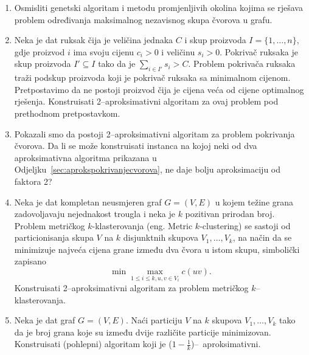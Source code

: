 \documentclass[a4paper, utf8, 11pt, colorlinks]{book}
\theoremstyle{definition}
\begin{document}
\begin{enumerate}
		\item Osmisliti genetski algoritam i metodu promjenljivih okolina kojima se rješava problem određivanja maksimalnog nezavisnog skupa čvorova u grafu.
		\item %
		   Neka je dat ruksak čija je veličina jednaka $C$ i skup proizvoda $I = \{1,\ldots, n\}$, gdje proizvod $i$ ima svoju cijenu $c_i>0$ i veličinu $s_i>0$. Pokrivač ruksaka je skup proizvoda $I' \subseteq I$ tako da je $\sum_{i \in I'} s_i > C$.  Problem pokrivača ruksaka traži podskup proizvoda koji je pokrivač ruksaka sa minimalnom    cijenom.   Pretpostavimo da ne postoji proizvod čija je cijena veća od    cijene optimalnog rješenja. Konstruisati 2--aproksimativni algoritam za ovaj problem pod prethodnom pretpostavkom. 
		   \item Pokazali smo da postoji 2--aproksimativni algoritam za problem pokrivanja čvorova. Da li se može konstruisati instanca na kojoj neki od dva aproksimativna algoritma prikazana u Odjeljku~\ref{sec:aprokspokrivanjecvorova}, ne daje bolju aproksimaciju od faktora 2? 
 
		   \item %
		   Neka je dat kompletan neusmjeren graf $G = (V, E)$ u kojem težine grana zadovoljavaju nejednakost trougla i neka je $k$ pozitivan prirodan broj. Problem metričkog $k$-klasterovanja (eng. Metric $k$-clustering)  se sastoji od particionisanja skupa $V$ na $k$ disjunktnih skupova $V_1, \ldots, V_k$, na način da se  minimizuje najveća cijena grane  između dva čvora u istom skupu, simbolički zapisano
		   $$ \min\max_{1 \leq i \leq k, u,v \in V_i} c(uv).$$
		   Konstruisati 2--aproksimativni algoritam za problem metričkog $k$--klasterovanja. 
		\item %
		 Neka je dat   graf $G=(V,E)$. Naći particiju $V$ na $k$ skupova $V_1,\ldots, V_k$ tako da je broj grana koje su između dvije različite particije minimizovan. Konstruisati (pohlepni) algoritam koji je ($1-\frac{1}{k}$)--~aproksimativni. 
		 
 

 

\end{enumerate}
\end{document}
